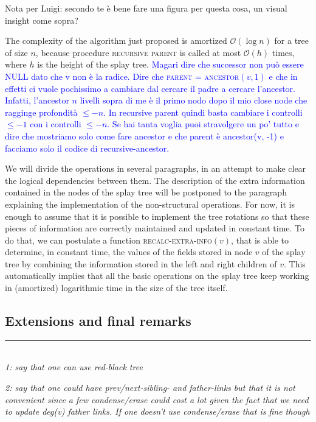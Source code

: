 \documentclass[a4paper,USenglish]{lipics}
\newcommand{\bigoh}{\mathcal{O}}
\begin{document}
			\textcolor[rgb]{.4,.4,.4}{Nota per Luigi: secondo te è bene fare una figura per questa cosa, un visual insight come sopra?}


			The complexity of the algorithm just proposed is amortized $\bigoh(\log n)$ for a tree of size $n$, because procedure \textsc{recursive parent} is called at most $\bigoh(h)$ times, where $h$ is the height of the splay tree. \textcolor{blue}{Magari dire che successor non può essere NULL dato che v non è la radice.}
			\textcolor{blue}{Dire che \textsc{parent} = \textsc{ancestor}$(v, 1)$ e che in effetti ci vuole pochissimo a cambiare dal cercare il padre a cercare l'ancestor. Infatti, l'ancestor $n$ livelli sopra di me è il primo nodo dopo il mio close node che ragginge profondità $\le -n$. In recursive parent quindi basta cambiare i controlli $\le -1$ con i controlli $\le -n$. Se hai tanta voglia puoi stravolgere un po' tutto e dire che mostriamo solo come fare ancestor e che parent è ancestor(v, -1) e facciamo solo il codice di recursive-ancestor.}


		We will divide the operations in several paragraphs, in an attempt to make clear the logical dependencies between them. The description of the extra information contained in the nodes of the splay tree will be postponed to the paragraph explaining the implementation of the non-structural operations. For now, it is enough to assume that it is possible to implement the tree rotations so that these pieces of information are correctly maintained and updated in constant time. To do that, we can postulate a function \textsc{recalc-extra-info}$(v)$, that is able to determine, in constant time,  the values of the fields stored in node $v$ of the splay tree by combining the information stored in the left and right children of $v$. This automatically implies that all the basic operations on the splay tree keep working in (amortized) logarithmic time in the size of the tree itself.
		
	\subsection{Extensions and final remarks}\vspace{-.5cm}\rule{\linewidth}{.5pt}\\[1mm]
		\label{subsec:dft final remarks}
			\emph{1: say that one can use red-black tree}
			
			\emph{2: say that one could have prev/next-sibling- and father-links but that it is not convenient since a few condense/erase could cost a lot given the fact that we need to update deg(v) father links. If one doesn't use condense/erase that is fine though}
			
\end{document}
